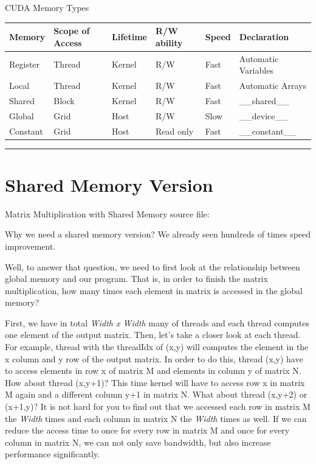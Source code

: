 \documentclass[letterpaper,10pt,english]{sphinxmanual}
\begin{document}
\begin{threeparttable}
\capstart\caption{CUDA Memory Types}

\begin{tabulary}{\linewidth}{|L|L|L|L|L|L|}
\hline
\textbf{
Memory
} & \textbf{
Scope of Access
} & \textbf{
Lifetime
} & \textbf{
R/W ability
} & \textbf{
Speed
} & \textbf{
Declaration
}\\\hline

Register
 & 
Thread
 & 
Kernel
 & 
R/W
 & 
Fast
 & 
Automatic Variables
\\\hline

Local
 & 
Thread
 & 
Kernel
 & 
R/W
 & 
Fast
 & 
Automatic Arrays
\\\hline

Shared
 & 
Block
 & 
Kernel
 & 
R/W
 & 
Fast
 & 
\_\_shared\_\_
\\\hline

Global
 & 
Grid
 & 
Host
 & 
R/W
 & 
Slow
 & 
\_\_device\_\_
\\\hline

Constant
 & 
Grid
 & 
Host
 & 
Read only
 & 
Fast
 & 
\_\_constant\_\_
\\\hline
\end{tabulary}

\end{threeparttable}



\bigskip\hrule{}\bigskip



\section{Shared Memory Version}
\label{CUDA2D/CUDA2D:tesla-c2075}\label{CUDA2D/CUDA2D:shared-memory-version}
Matrix Multiplication with Shared Memory source file:

Why we need a shared memory version? We already seen hundreds of times speed improvement.

Well, to answer that question, we need to first look at the relationship between global memory and our program. That is, in order to finish the matrix multiplication, how many times each element in matrix is accessed in the global memory?

First, we have in total \emph{Width x Width} many of threads and each thread computes one element of the output matrix. Then, let's take a closer look at each thread. For example, thread with the threadIdx of (x,y) will computes the element in the x column and y row of the output matrix. In order to do this, thread (x,y) have to access elements in row x of matrix M and elements in column y of matrix N. How about thread (x,y+1)? This time kernel will have to access row x in matrix M again and a different column y+1 in matrix N. What about thread (x,y+2) or (x+1,y)? It is not hard for you to find out that we accessed each row in matrix M the \emph{Width} times and each column in matrix N the \emph{Width} times as well. If we can reduce the access time to once for every row in matrix M and once for every column in matrix N, we can not only save bandwidth, but also increase performance significantly.
\end{document}
